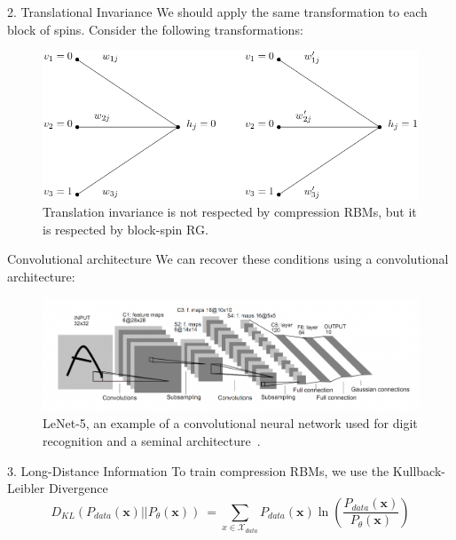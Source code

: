\documentclass{beamer}
\newcommand{\bolds}[1]{\boldsymbol{#1}}
\newcommand{\mcX}{\mathcal{X}}
\newcommand{\bx}{\bolds{x}}
\begin{document}
\begin{frame}{2. Translational Invariance}
  We should apply the same transformation to each block of spins.
  Consider the following transformations:
  \begin{figure}[ht]
    \centering
    \includegraphics[width=0.7\linewidth]{figures/translation-invariance.png}
    \caption{Translation invariance is not respected by compression
      RBMs, but it is respected by block-spin RG.}
  \end{figure}
\end{frame}

\begin{frame}{Convolutional architecture}
  We can recover these conditions using a convolutional architecture:
\begin{figure}[]
  \centering \includegraphics[width=\textwidth]{figures/cnn.png}
  \caption{LeNet-5, an example of a convolutional neural
    network used for digit recognition and a seminal
    architecture~\cite{lecun}.\label{fig:cnn} }
\end{figure}
\end{frame}

\begin{frame}{3. Long-Distance Information}
  To train compression RBMs, we use the Kullback-Leibler Divergence
  \begin{equation*}
    \boxed{D_{KL}(P_{data}(\bx)||P_{\theta}(\bx))\:=\sum_{x\in\mcX_{data}} P_{data}(\bx)\ln\left(\frac{P_{data}(\bx)}{P_{\theta}(\bx)}\right)}
  \end{equation*}
\end{frame}
\end{document}
